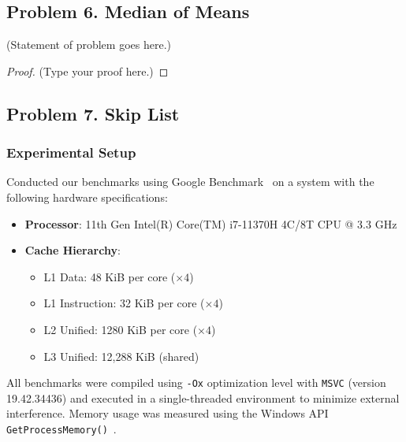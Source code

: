 \documentclass[12pt]{article}
\begin{document}
	\vspace{2in} %
	
	
	\subsection*{Problem 6. Median of Means}
	(Statement of problem goes here.)\\
	
	\begin{proof}
		(Type your proof here.)
	\end{proof}
	
	\vspace{2in} %
	
	\pagebreak


	\subsection*{Problem 7. Skip List}
	\vspace{20pt}
	\subsubsection*{Experimental Setup}
	Conducted our benchmarks using Google Benchmark~\cite{google-bench} on a system with the following hardware specifications:

\begin{itemize}
	\small
    \item \textbf{Processor}: 11th Gen Intel(R) Core(TM) i7-11370H 4C/8T CPU @ 3.3 GHz
    \item \textbf{Cache Hierarchy}:
    \begin{itemize}
        \item L1 Data: 48 KiB per core (\(\times 4\))
        \item L1 Instruction: 32 KiB per core (\(\times 4\))
        \item L2 Unified: 1280 KiB per core (\(\times 4\))
        \item L3 Unified: 12,288 KiB (shared)
    \end{itemize}
\end{itemize}

All benchmarks were compiled using \texttt{-Ox} optimization level with \texttt{MSVC} (version 19.42.34436) and executed in a single-threaded environment to minimize external interference. Memory usage was measured using the Windows API \texttt{GetProcessMemory()}~\cite{getprocessmemoryinfo}.\\
\end{document}
